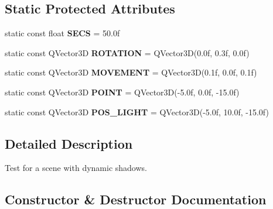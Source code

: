 \subsection*{Static Protected Attributes}
\begin{DoxyCompactItemize}
\item 
\mbox{\label{class_unit_test_1_1_c_shadow_scene_test_a5900558120db2a03e0c92c9fa00d7280}} 
static const float {\bfseries S\+E\+CS} = 50.\+0f
\item 
\mbox{\label{class_unit_test_1_1_c_shadow_scene_test_a1f12a970d2370275d2efb0ced7242788}} 
static const Q\+Vector3D {\bfseries R\+O\+T\+A\+T\+I\+ON} = Q\+Vector3D(0.\+0f, 0.\+3f, 0.\+0f)
\item 
\mbox{\label{class_unit_test_1_1_c_shadow_scene_test_a4eb5492e456b57b4a8c1459476824a40}} 
static const Q\+Vector3D {\bfseries M\+O\+V\+E\+M\+E\+NT} = Q\+Vector3D(0.\+1f, 0.\+0f, 0.\+1f)
\item 
\mbox{\label{class_unit_test_1_1_c_shadow_scene_test_aab8a2e57c38671d832311ef217e11bff}} 
static const Q\+Vector3D {\bfseries P\+O\+I\+NT} = Q\+Vector3D(-\/5.\+0f, 0.\+0f, -\/15.\+0f)
\item 
\mbox{\label{class_unit_test_1_1_c_shadow_scene_test_a60c4d3eb077426f316d6e02b5e87be3b}} 
static const Q\+Vector3D {\bfseries P\+O\+S\+\_\+\+L\+I\+G\+HT} = Q\+Vector3D(-\/5.\+0f, 10.\+0f, -\/15.\+0f)
\end{DoxyCompactItemize}


\subsection{Detailed Description}
Test for a scene with dynamic shadows. 

\subsection{Constructor \& Destructor Documentation}
\mbox{\label{class_unit_test_1_1_c_shadow_scene_test_a3bf2724745aa4037cc80a8d3b770bb07}} 
